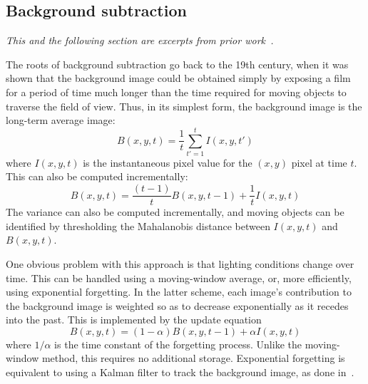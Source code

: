 \subsection{Background subtraction}\label{background-subtraction-section}

\centerline{\em This and the following section are excerpts from prior
  work~\cite{friedman1997image}.}

The roots of background subtraction go back to the 19th century, when
it was shown that the background image could be obtained simply by
exposing a film for a period of time much longer than the time
required for moving objects to traverse the field of view. Thus, in
its simplest form, the background image is the long-term average
image:
\[ B(x,y,t) = \frac{1}{t}\sum_{t'=1}^t I(x,y,t') \]
where $I(x,y,t)$ is the instantaneous pixel value for the $(x,y)$
pixel at time $t$. This can also be computed incrementally:
\[B(x,y,t) = \frac{(t-1)}{t}B(x,y,t-1) + \frac{1}{t}I(x,y,t)\]
The variance can also be computed incrementally, and moving
objects can be identified by thresholding the Mahalanobis distance
between $I(x,y,t)$ and $B(x,y,t)$.

One obvious problem with this approach is that lighting conditions
change over time. This can be handled using a moving-window average,
or, more efficiently, using exponential forgetting. In the latter
scheme, each image's contribution to the background image is weighted
so as to decrease exponentially as it recedes into the past. This is
implemented by the update equation
\begin{equation}
B(x,y,t) = (1-\alpha)B(x,y,t-1) + \alpha I(x,y,t)
\label{forgetting-equation}
\end{equation}
where $1/\alpha$ is the time constant of the forgetting process.
Unlike the moving-window method, this requires no additional storage.
Exponential forgetting is equivalent to using a Kalman filter to track
the background image, as done in~\cite{Koller+al:1994}.




